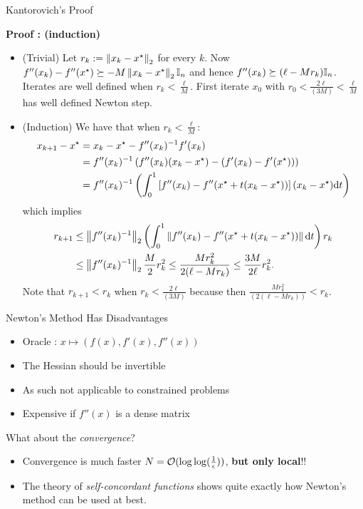 \documentclass[9pt]{beamer}
\begin{document}
\begin{frame}{Kantorovich's Proof}

  
  \textbf{Proof : (induction)}

  \begin{itemize}
  \item (Trivial) Let $r_k := \left\|x_k-x^\star\right\|_2$ for every $k$. Now $f''(x_k) -f''(x^\star) \succeq -M \left\|x_k-x^\star\right\|_2 \mathbb I_n$ and hence $f''(x_k) \succeq (\ell - M r_k) \mathbb I_n$.  Iterates are well defined when $r_k < \tfrac{\ell}{M}$. First iterate $x_0$ with $r_0 <  \tfrac{2\ell}{(3M)}<\tfrac{\ell}{M}$  has well defined Newton step.\\[1em]
  \item (Induction) We have that when $r_k < \tfrac \ell M$:
    \begin{align*}
      x_{k+1} - x^\star & = x_k - x^\star - f''(x_k)^{-1} f'(x_k)\\
                        & = f''(x_k)^{-1} \left( f''(x_k) (x_k - x^\star) - (f'(x_k)-f'(x^\star))  \right)\\
                        & = f''(x_k)^{-1} \left( \int_0^1 \left[ f''(x_k) - f''(x^\star + t (x_k - x^\star)) \right] (x_k - x^\star) {\mathrm{d}} t \right)
    \end{align*}
    which implies
    \begin{align*}
      r_{k+1} & \leq \left\|f''(x_k)^{-1}\right\|_2 \left( \int_0^1 \left\|f''(x_k) - f''(x^\star + t (x_k - x^\star))\right\|{\mathrm{d}} t \right) r_k\\
              & \leq \left\|f''(x_k)^{-1}\right\|_2 \frac{M}{2} r^2_k\leq \frac{M r_k^2}{2 (\ell - M r_k)} \leq \frac{3M}{2\ell} r_k^2. 
    \end{align*}
    Note that $r_{k+1} < r_k$ when $r_k< \tfrac{2\ell}{(3 M)}$ because then $\tfrac{M r_k^2}{(2 (\ell-M r_k))} < r_k$.

  \end{itemize}
\end{frame}

\begin{frame}{Newton's Method Has Disadvantages}

  \begin{itemize}
    \setlength\itemsep{1em}
  \item Oracle : $x\mapsto (f(x), f'(x), f''(x))$
  \item The Hessian should be invertible
  \item As such not applicable to constrained problems
  \item Expensive if $f''(x)$ is a dense matrix
  \end{itemize}

  \vfill

  What about the \emph{convergence}?
  \begin{itemize}
    \setlength\itemsep{1em}
  \item Convergence is much faster $N = \mathcal O(\log\log(\frac 1\epsilon))$, \textbf{but only local}!!
  \item The theory of \emph{self-concordant functions} shows quite exactly how Newton's method can be used at best.
  \end{itemize}
  
\end{frame}
\end{document}
